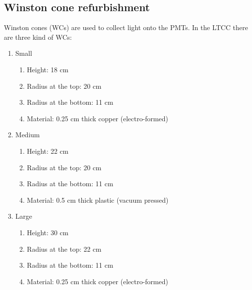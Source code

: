 \subsection{Winston cone refurbishment}

Winston cones (WCs) are used to collect light onto the PMTs. In the LTCC there are three kind of WCs:

\begin{enumerate}

\item Small
	\begin{enumerate}
		\item Height: 18 cm
		\item Radius at the top: 20 cm
		\item Radius at the bottom: 11 cm
		\item Material: 0.25 cm thick copper (electro-formed)
	\end{enumerate}

	\item Medium
	\begin{enumerate}
		\item Height: 22 cm
		\item Radius at the top: 20 cm
		\item Radius at the bottom: 11 cm
		\item Material: 0.5 cm thick plastic (vacuum pressed)
	\end{enumerate}

	\item Large
	\begin{enumerate}
		\item Height: 30 cm
		\item Radius at the top: 22 cm
		\item Radius at the bottom: 11 cm
		\item Material: 0.25 cm thick copper (electro-formed)
	\end{enumerate}
\end{enumerate}

